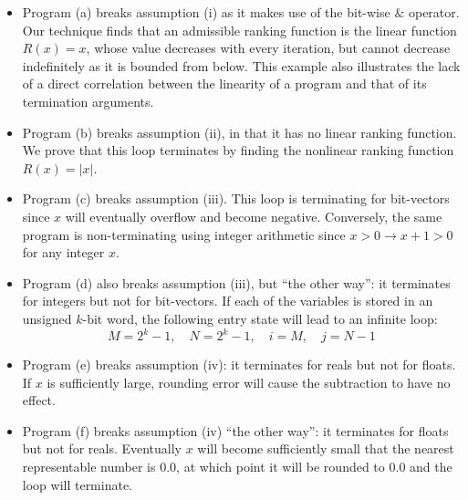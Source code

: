 \documentclass[preprint]{sigplanconf}
\theoremstyle{definition}
\begin{document}
%
\begin{itemize}

\item Program (a) breaks assumption (i) as it makes use of the bit-wise $\&$ operator.
%
Our technique finds that an admissible ranking function is the linear
function $R(x) = x$, whose value decreases with every iteration, but cannot
decrease indefinitely as it is bounded from below.  This example also
illustrates the lack of a direct correlation between the linearity of a
program and that of its termination arguments.

\item Program (b) breaks assumption (ii), in that it has no linear ranking
function.  We prove that this loop terminates by finding the nonlinear
ranking function $R(x) = |x|$.

\item Program (c) breaks assumption (iii).  This loop is terminating for
bit-vectors since $x$ will eventually overflow and become negative. 
Conversely, the same program is non-terminating using integer arithmetic
since $x > 0 \rightarrow x+1 > 0$ for any integer $x$.

\item Program (d) also breaks assumption (iii), but ``the other way'': it
terminates for integers but not for bit-vectors.  If each of the variables
is stored in an unsigned $k$-bit word, the following entry state will lead
to an infinite loop:
%
$$ M = 2^k - 1,\quad N = 2^k - 1,\quad i = M,\quad j = N-1 $$

\item Program (e) breaks assumption (iv): it terminates for reals but not
for floats.  If $x$ is sufficiently large, rounding error will cause the
subtraction to have no effect.

\item Program (f) breaks assumption (iv) ``the other way'': it terminates
for floats but not for reals.  Eventually $x$ will become sufficiently small
that the nearest representable number is $0.0$, at which point it will be
rounded to $0.0$ and the loop will terminate.

\end{itemize}
\end{document}
